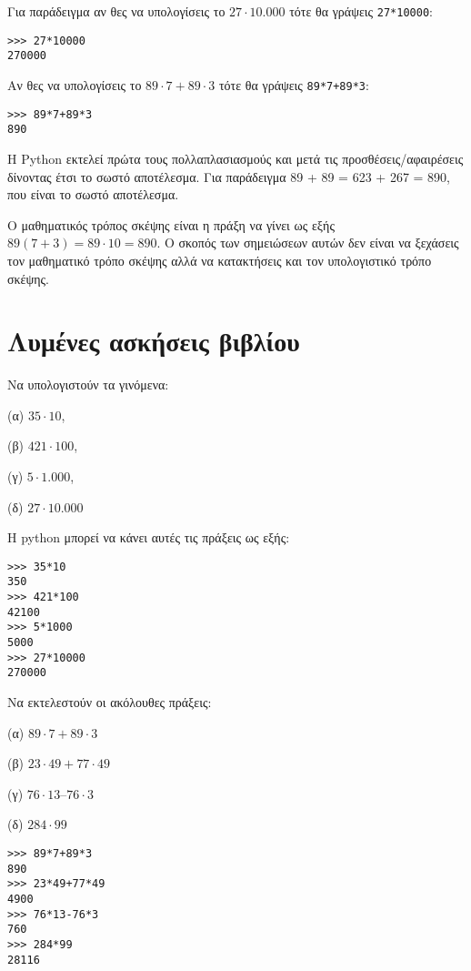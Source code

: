 Για παράδειγμα αν θες να υπολογίσεις το $27 \cdot 10.000$ τότε θα γράψεις \lstinline{27*10000}:
\begin{lstlisting}
>>> 27*10000
270000
\end{lstlisting}

Αν θες να υπολογίσεις το $89\cdot 7 + 89\cdot 3$ τότε θα γράψεις \lstinline{89*7+89*3}:
\begin{lstlisting}
>>> 89*7+89*3
890
\end{lstlisting}

Η Python εκτελεί πρώτα τους πολλαπλασιασμούς και μετά τις προσθέσεις/αφαιρέσεις δίνοντας έτσι το σωστό αποτέλεσμα. Για παράδειγμα 89 + 89 = 623 + 267 = 890, που είναι το σωστό αποτέλεσμα.

Ο μαθηματικός τρόπος σκέψης είναι η πράξη να γίνει ως εξής $89(7+3) = 89\cdot 10 = 890$. Ο σκοπός των σημειώσεων αυτών δεν είναι να ξεχάσεις τον μαθηματικό τρόπο σκέψης αλλά να κατακτήσεις και τον υπολογιστικό τρόπο σκέψης.



\section{Λυμένες ασκήσεις βιβλίου}
\begin{exercise}
Να υπολογιστούν τα γινόμενα: 

(α) $35 \cdot 10$, 

(β) $421 \cdot 100$,

(γ) $5 \cdot 1.000$,

(δ) $27 \cdot 10.000$
\end{exercise}

Η python μπορεί να κάνει αυτές τις πράξεις ως εξής:
\begin{lstlisting}
>>> 35*10
350
>>> 421*100
42100
>>> 5*1000
5000
>>> 27*10000
270000
\end{lstlisting}



\begin{exercise}
Να εκτελεστούν οι ακόλουθες πράξεις:

(α) $89\cdot 7 + 89\cdot 3$

(β) $23 \cdot 49 + 77 \cdot 49$

(γ) $76 \cdot 13 – 76 \cdot 3$

(δ) $284 \cdot 99$
\end{exercise}
\begin{lstlisting}
>>> 89*7+89*3
890
>>> 23*49+77*49
4900
>>> 76*13-76*3
760
>>> 284*99
28116
\end{lstlisting}

